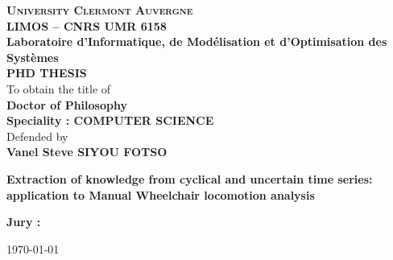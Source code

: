 \begin{titlepage}
\begin{center}
\large{ \textbf{ \textsc{University Clermont Auvergne} } }\\
\large{ \textbf{ \textsc{LIMOS – CNRS UMR 6158}}}\\
\large{ \textbf{Laboratoire d’Informatique, de Modélisation et d’Optimisation des Systèmes}}\\
\large{ \textbf{ \textsc{PHD THESIS}}}\\
To obtain the title of\\
\large{ \textbf{ Doctor of Philosophy}}\\
\large{ \textbf{ Speciality : COMPUTER SCIENCE}}\\
Defended by\\
\large{ \textbf{ Vanel Steve SIYOU FOTSO}}\\

\end{center}
\hrulefill
\hrulefill
\begin{center}\bfseries\Huge
        Extraction of knowledge from cyclical and uncertain time series: application to Manual Wheelchair locomotion analysis
\end{center}
\hrulefill
\vspace*{1cm}
    
\begin{center}%
\textbf{ Jury : }\\

\end{center}
\begin{flushright}
        \today 
\end{flushright}   
\end{titlepage}